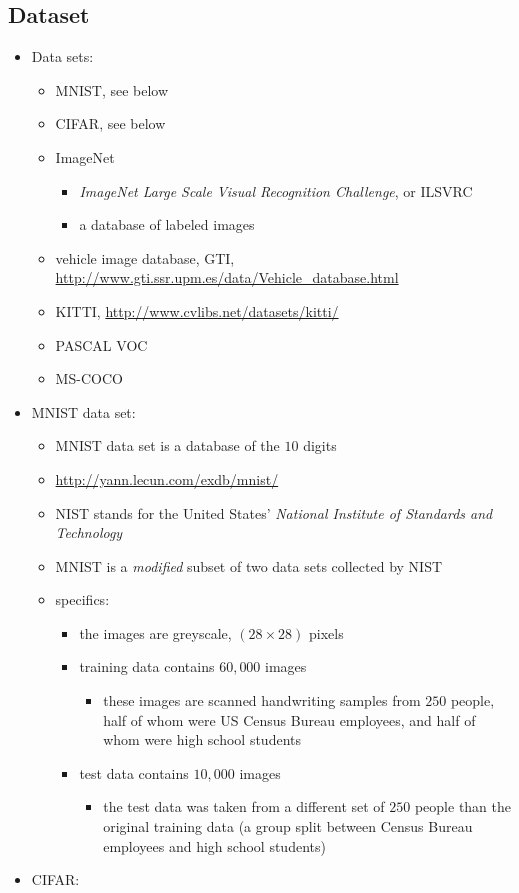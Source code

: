 \documentclass[onecolumn]{IEEEtran}
\newcommand{\bi}{\begin{itemize}}
\newcommand{\ei}{\end{itemize}}
\begin{document}
\subsection{Dataset}
\begin{itemize}
    \item Data sets:
    \bi
        \item MNIST, see below
        \item CIFAR, see below
        \item ImageNet
        \bi
            \item \emph{ImageNet Large Scale Visual Recognition Challenge}, or ILSVRC
            \item a database of labeled images
        \ei
        \item vehicle image database, GTI, \url{http://www.gti.ssr.upm.es/data/Vehicle_database.html}
        \item KITTI, \url{http://www.cvlibs.net/datasets/kitti/}
        \item PASCAL VOC
        \item MS-COCO
    \ei
    \item MNIST data set:
     \bi
        \item  MNIST data set is a database of the $10$ digits
        \item \url{http://yann.lecun.com/exdb/mnist/}
        \item NIST stands for the United States' \textit{National Institute of Standards and Technology}
        \item MNIST is a \emph{modified} subset of two data sets collected by NIST
        \item specifics:
        \bi
            \item the images are greyscale, $(28 \times 28)$ pixels
            \item training data contains $60,000$ images
            \bi
                \item these images are scanned handwriting samples from $250$ people, half of whom were US Census Bureau employees, and half of whom were high school students
            \ei
            \item test data contains $10,000$ images
            \bi
                \item the test data was taken from a different set of $250$ people than the original training data (a group split between Census Bureau employees and high school students)
            \ei
        \ei
     \ei
     \item CIFAR:

\end{itemize}
\end{document}
